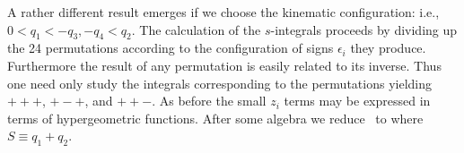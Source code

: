 A rather different result emerges if
we choose the kinematic configuration:
\eqn{}
i.e., $0<q_1<-q_3,-q_4<q_2$. 
The calculation of the $s$-integrals proceeds by dividing up the 24 permutations
according to the configuration of signs $\epsilon_i$ they 
produce. Furthermore the result of any permutation is easily
related to its inverse. Thus one need only study the integrals 
corresponding to the permutations yielding $+++$, $+-+$, and $++-$. 
As before the small $z_i$ terms may be expressed in terms of 
hypergeometric functions. 
% 
%
After some algebra we reduce \macptii\ to 
\eqn{}
where $S\equiv q_1+q_2$. 


